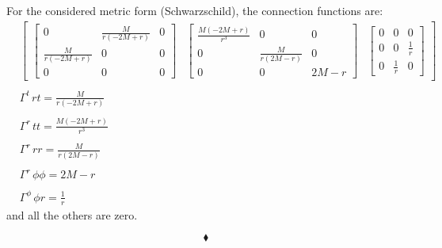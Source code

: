For the considered metric form (Schwarzschild), the connection functions are:
\begin{align}
&\left[\begin{matrix}\left[\begin{matrix}0 & \frac{M}{r \left(- 2 M + r\right)} & 0\\\frac{M}{r \left(- 2 M + r\right)} & 0 & 0\\0 & 0 & 0\end{matrix}\right] & \left[\begin{matrix}\frac{M \left(- 2 M + r\right)}{r^{3}} & 0 & 0\\0 & \frac{M}{r \left(2 M - r\right)} & 0\\0 & 0 & 2 M - r\end{matrix}\right] & \left[\begin{matrix}0 & 0 & 0\\0 & 0 & \frac{1}{r}\\0 & \frac{1}{r} & 0\end{matrix}\right]\end{matrix}\right]\\\\
&\Gamma^{t}{\,rt}= \frac{M}{r \left(- 2 M + r\right)}\\\\
&\Gamma^{r}{\,tt}= \frac{M \left(- 2 M + r\right)}{r^{3}}\\\\
&\Gamma^{r}{\,rr}= \frac{M}{r \left(2 M - r\right)}\\\\
&\Gamma^{r}{\,\phi\phi}= 2 M - r\\\\
&\Gamma^{\phi}{\,\phi r}= \frac{1}{r}
\end{align}
and all the others are zero.

$$\blacklozenge$$\newpage